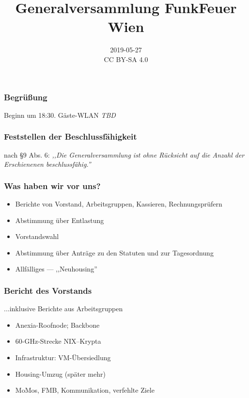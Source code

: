 \documentclass[17pt]{beamer} %
\title[]{Generalversammlung FunkFeuer Wien}
\date[]{2019-05-27\\\vspace{1cm}\tiny CC BY-SA 4.0}
\begin{document}
\frame{\titlepage}

%

\begin{frame}
	\frametitle{Begrüßung}
	Beginn um 18:30.
	Gäste-WLAN \textit{TBD}
\end{frame}



\begin{frame}
	\frametitle{Feststellen der Beschlussfähigkeit}
	nach §9 Abs. 6:
	\textit{,,Die Generalversammlung ist ohne Rücksicht auf die Anzahl der
	Erschienenen beschlussfähig.''}
\end{frame}



\begin{frame}
	\frametitle{Was haben wir vor uns?}
	\begin{itemize}
		\item Berichte von Vorstand, Arbeitsgruppen, Kassieren,
		Rechnungsprüfern
		\item Abstimmung über Entlastung
		\item Vorstandswahl
		\item Abstimmung über Anträge zu den Statuten und zur Tagesordnung
		\item Allfälliges --- ,,Neuhousing''
	\end{itemize}
\end{frame}



\begin{frame}
	\frametitle{Bericht des Vorstands}
	...inklusive Berichte aus Arbeitsgruppen
	\begin{itemize}
		\item Anexia-Roofnode; Backbone
		\item 60-GHz-Strecke NIX--Krypta
		\item Infrastruktur: VM-Übersiedlung
		\item Housing-Umzug (später mehr)
		\item MoMos, FMB, Kommunikation, verfehlte Ziele
	\end{itemize}
\end{frame}
\end{document}
